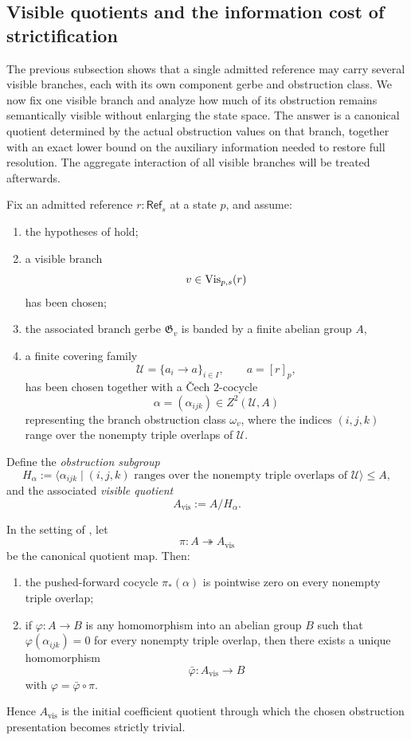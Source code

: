 \subsection{Visible quotients and the information cost of strictification}

The previous subsection shows that a single admitted reference may carry several visible branches, each with its own component gerbe and obstruction class. We now fix one visible branch and analyze how much of its obstruction remains semantically visible without enlarging the state space. The answer is a canonical quotient determined by the actual obstruction values on that branch, together with an exact lower bound on the auxiliary information needed to restore full resolution. The aggregate interaction of all visible branches will be treated afterwards.

\begin{definition}\label{def:finite-obstruction-presentation}
Fix an admitted reference $r:\mathsf{Ref}_s$ at a state $p$, and assume:
\begin{enumerate}[label=(\roman*),nosep]
\item the hypotheses of  hold;
\item a visible branch
\[
v\in \mathrm{Vis}_{p,s}(r)
\]
has been chosen;
\item the associated branch gerbe $\mathfrak G_v$ is banded by a finite abelian group $A$,
\item a finite covering family
\[
\mathcal U=\{a_i\to a\}_{i\in I},
\qquad
a=[r]_p,
\]
has been chosen together with a \v{C}ech $2$-cocycle
\[
\alpha=(\alpha_{ijk})\in Z^2(\mathcal U,A)
\]
representing the branch obstruction class $\omega_v$, where the indices $(i,j,k)$ range over the nonempty triple overlaps of $\mathcal U$.
\end{enumerate}
Define the \emph{obstruction subgroup}
\[
H_\alpha:=\langle \alpha_{ijk}\mid (i,j,k)\text{ ranges over the nonempty triple overlaps of }\mathcal U\rangle\le A,
\]
and the associated \emph{visible quotient}
\[
A_{\mathrm{vis}}:=A/H_\alpha.
\]
\end{definition}

\begin{theorem}\label{thm:initial-visible-quotient}
In the setting of , let
\[
\pi:A\twoheadrightarrow A_{\mathrm{vis}}
\]
be the canonical quotient map. Then:
\begin{enumerate}[label=(\roman*),nosep]
\item the pushed-forward cocycle $\pi_*(\alpha)$ is pointwise zero on every nonempty triple overlap;
\item if $\varphi:A\to B$ is any homomorphism into an abelian group $B$ such that $\varphi(\alpha_{ijk})=0$ for every nonempty triple overlap, then there exists a unique homomorphism
\[
\bar\varphi:A_{\mathrm{vis}}\to B
\]
with $\varphi=\bar\varphi\circ\pi$.
\end{enumerate}
Hence $A_{\mathrm{vis}}$ is the initial coefficient quotient through which the chosen obstruction presentation becomes strictly trivial.
\end{theorem}

